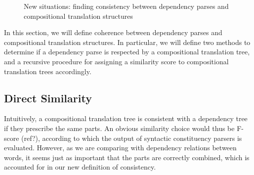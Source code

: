 \documentclass{report}
\theoremstyle{break}
\begin{document}
\begin{figure}[!ht]
\centering
{}
\caption{New situations: finding consistency between dependency parses and compositional translation structures}\label{fig:depshats}
\end{figure}

\noindent In this section, we will define coherence between dependency parses and compositional translation structures. In particular, we will define two methods to determine if a dependency parse is respected by a compositional translation tree,  and a recursive procedure for assigning a similarity score to compositional translation trees accordingly. 

\subsection{Direct Similarity}

Intuitively, a compositional translation tree is consistent with a dependency tree if they prescribe the same parts. An obvious similarity choice would thus be F-score (ref?), according to which the output of syntactic constituency parsers is evaluated. However, as we are comparing with dependency relations between words, it seems just as important that the parts are correctly combined, which is accounted for in our new definition of consistency. 
\end{document}
